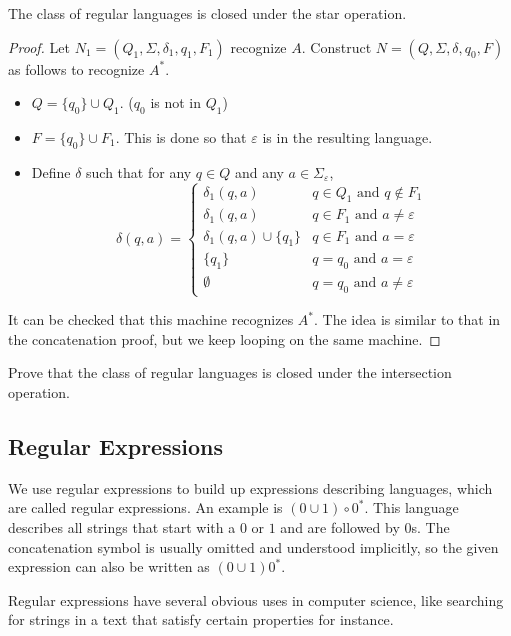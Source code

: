 \begin{theorem}
The class of regular languages is closed under the star operation.
\end{theorem}
\begin{proof}
Let $N_1=(Q_1,\Sigma,\delta_1,q_1,F_1)$ recognize $A$. Construct $N=(Q,\Sigma,\delta,q_0,F)$ as follows to recognize $A^*$.
\begin{itemize}
	\item $Q=\{q_0\}\cup Q_1$. ($q_0$ is not in $Q_1$)
	\item $F=\{q_0\}\cup F_1$. This is done so that $\varepsilon$ is in the resulting language.
	\item Define $\delta$ such that for any $q\in Q$ and any $a\in\Sigma_\varepsilon$,
	$$
	\delta(q,a)=
	\begin{cases}
	\delta_1(q,a) & q\in Q_1\text{ and }q\not\in F_1 \\
	\delta_1(q,a) & q\in F_1\text{ and }a\neq\varepsilon \\
	\delta_1(q,a)\cup\{q_1\} & q\in F_1\text{ and }a=\varepsilon \\
	\{q_1\} & q=q_0\text{ and }a=\varepsilon \\
	\emptyset & q=q_0\text{ and }a\neq\varepsilon
	\end{cases}
	$$
\end{itemize}

It can be checked that this machine recognizes $A^*$. The idea is similar to that in the concatenation proof, but we keep looping on the same machine.
\end{proof}

\begin{exercise}
Prove that the class of regular languages is closed under the intersection operation.
\end{exercise}
\clearpage

\subsection{Regular Expressions}
We use regular expressions to build up expressions describing languages, which are called regular expressions. An example is $(0\cup 1)\circ 0^*$. This language describes all strings that start with a $0$ or $1$ and are followed by $0$s. The concatenation symbol is usually omitted and understood implicitly, so the given expression can also be written as $(0\cup 1)0^*$.

\vspace{2mm}
Regular expressions have several obvious uses in computer science, like searching for strings in a text that satisfy certain properties for instance.

